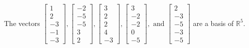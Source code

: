 \begin{exercise}
\begin{exerciseStatement}
  \end{exerciseStatement}
  \begin{exerciseAnswer}
   The vectors \(\left[\begin{array}{r}
1 \\
2 \\
-3 \\
-1 \\
-3
\end{array}\right] , \left[\begin{array}{r}
-2 \\
-5 \\
-5 \\
3 \\
2
\end{array}\right] , \left[\begin{array}{r}
3 \\
2 \\
2 \\
4 \\
-3
\end{array}\right] , \left[\begin{array}{r}
3 \\
-2 \\
-2 \\
0 \\
-5
\end{array}\right] , \text{ and } \left[\begin{array}{r}
2 \\
-3 \\
-5 \\
-3 \\
-5
\end{array}\right]\) 
  	 are  a basis of \(\mathbb{R}^5\).
  


  \end{exerciseAnswer}
\end{exercise}